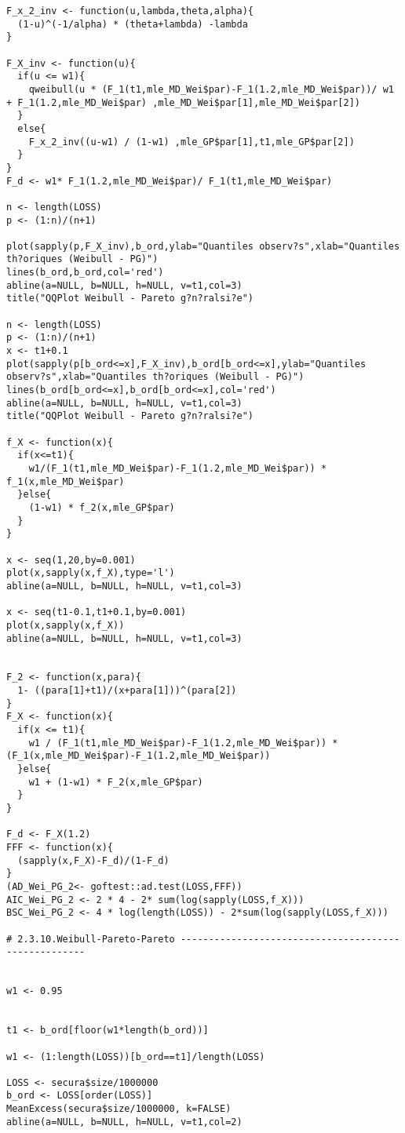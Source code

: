 \begin{verbatim}
F_x_2_inv <- function(u,lambda,theta,alpha){
  (1-u)^(-1/alpha) * (theta+lambda) -lambda
}

F_X_inv <- function(u){
  if(u <= w1){
    qweibull(u * (F_1(t1,mle_MD_Wei$par)-F_1(1.2,mle_MD_Wei$par))/ w1 + F_1(1.2,mle_MD_Wei$par) ,mle_MD_Wei$par[1],mle_MD_Wei$par[2])
  }
  else{
    F_x_2_inv((u-w1) / (1-w1) ,mle_GP$par[1],t1,mle_GP$par[2])
  }  
}
F_d <- w1* F_1(1.2,mle_MD_Wei$par)/ F_1(t1,mle_MD_Wei$par)

n <- length(LOSS)
p <- (1:n)/(n+1)

plot(sapply(p,F_X_inv),b_ord,ylab="Quantiles observ?s",xlab="Quantiles th?oriques (Weibull - PG)")
lines(b_ord,b_ord,col='red')
abline(a=NULL, b=NULL, h=NULL, v=t1,col=3)
title("QQPlot Weibull - Pareto g?n?ralsi?e")

n <- length(LOSS)
p <- (1:n)/(n+1)
x <- t1+0.1
plot(sapply(p[b_ord<=x],F_X_inv),b_ord[b_ord<=x],ylab="Quantiles observ?s",xlab="Quantiles th?oriques (Weibull - PG)")
lines(b_ord[b_ord<=x],b_ord[b_ord<=x],col='red')
abline(a=NULL, b=NULL, h=NULL, v=t1,col=3)
title("QQPlot Weibull - Pareto g?n?ralsi?e")

f_X <- function(x){
  if(x<=t1){
    w1/(F_1(t1,mle_MD_Wei$par)-F_1(1.2,mle_MD_Wei$par)) * f_1(x,mle_MD_Wei$par)
  }else{
    (1-w1) * f_2(x,mle_GP$par)
  }
}

x <- seq(1,20,by=0.001)
plot(x,sapply(x,f_X),type='l')
abline(a=NULL, b=NULL, h=NULL, v=t1,col=3)

x <- seq(t1-0.1,t1+0.1,by=0.001)
plot(x,sapply(x,f_X))
abline(a=NULL, b=NULL, h=NULL, v=t1,col=3)


F_2 <- function(x,para){
  1- ((para[1]+t1)/(x+para[1]))^(para[2])
}
F_X <- function(x){
  if(x <= t1){
    w1 / (F_1(t1,mle_MD_Wei$par)-F_1(1.2,mle_MD_Wei$par)) * (F_1(x,mle_MD_Wei$par)-F_1(1.2,mle_MD_Wei$par))
  }else{
    w1 + (1-w1) * F_2(x,mle_GP$par)
  }
}

F_d <- F_X(1.2)
FFF <- function(x){
  (sapply(x,F_X)-F_d)/(1-F_d)
}
(AD_Wei_PG_2<- goftest::ad.test(LOSS,FFF))
AIC_Wei_PG_2 <- 2 * 4 - 2* sum(log(sapply(LOSS,f_X)))
BSC_Wei_PG_2 <- 4 * log(length(LOSS)) - 2*sum(log(sapply(LOSS,f_X)))

# 2.3.10.Weibull-Pareto-Pareto -----------------------------------------------------


w1 <- 0.95


t1 <- b_ord[floor(w1*length(b_ord))]

w1 <- (1:length(LOSS))[b_ord==t1]/length(LOSS)

LOSS <- secura$size/1000000
b_ord <- LOSS[order(LOSS)]
MeanExcess(secura$size/1000000, k=FALSE)
abline(a=NULL, b=NULL, h=NULL, v=t1,col=2)



\end{verbatim}
